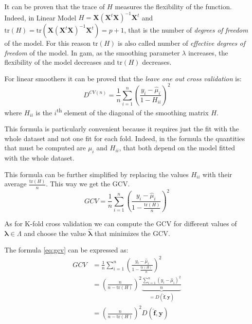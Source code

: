 \documentclass[a4paper, twoside, openright, 12pt]{report}
\theoremstyle{definition}
\theoremstyle{definition}
\theoremstyle{definition}
\theoremstyle{remark}
\begin{document}
It can be proven that the trace of \(H\) measures the flexibility of the function. Indeed, in Linear Model \(H = \boldsymbol{X} \left( \boldsymbol{X}^t\boldsymbol{X} \right)^{-1}\boldsymbol{X}^t\) and \(\text{tr}(H) = \text{tr}\left( \boldsymbol{X} \left( \boldsymbol{X}^t\boldsymbol{X} \right)^{-1}\boldsymbol{X}^t \right) = p + 1\), that is the number of \emph{degrees of freedom} of the model. For this reason \(\text{tr}(H)\) is also called number of \emph{effective degrees of freedom} of the model. In \ac{gam}, as the smoothing parameter \(\lambda\) increases, the flexibility of the model decreases and \(\text{tr}(H)\) decreases.

For linear smoothers it can be proved that the \emph{leave one out cross validation} is:
\[
D^{CV(n)} = \frac{1}{n} \sum_{i=1}^{n}{\left( \frac{y_i - \hat{\mu}_i}{1 - H_{ii}} \right)^2}
\]
where \(H_{ii}\) is the \(i\)\textsuperscript{th} element of the diagonal of the smoothing matrix \(H\).

This formula is particularly convenient because it requires just the fit with the whole dataset and not one fit for each fold. Indeed, in the formula the quantities that must be computed are \(\mu_i\) and \(H_{ii}\), that both depend on the model fitted with the whole dataset.

This formula can be further simplified by replacing the values \(H_{ii}\) with their average \(\frac{\text{tr}(H)}{n}\). This way we get the GCV.
\begin{equation}
\label{eq:gcv}
GCV = \frac{1}{n} \sum_{i=1}^{n}{\left( \frac{y_i - \hat{\mu}_i}{1 - \frac{\text{tr}(H)}{n}} \right)^2}
\end{equation}

As for K-fold cross validation we can compute the GCV for different values of \(\boldsymbol{\lambda} \in \Lambda\) and choose the value \(\boldsymbol{\hat{\lambda}}\) that minimizes the GCV.

The formula \eqref{eq:gcv} can be expressed as:
\begin{align}
\nonumber
GCV & = \frac{1}{n} \sum_{i=1}^{n}{\left( \frac{y_i - \hat{\mu}_i}{1 - \frac{\text{tr}(H)}{n}} \right)^2} \\
\nonumber
& = \left( \frac{n}{n - \text{tr}(H)} \right)^2 \underbrace{\frac{\sum_{i=1}^{n}{\left( y_i - \hat{\mu}_i \right)^2}}{n}}_{=D(\boldsymbol{\hat{f}},\boldsymbol{y})} \\
\label{eq:gcv-gam}
& = \left( \frac{n}{n - \text{tr}(H)} \right)^2 D(\boldsymbol{\hat{f}},\boldsymbol{y})
\end{align}
\end{document}
